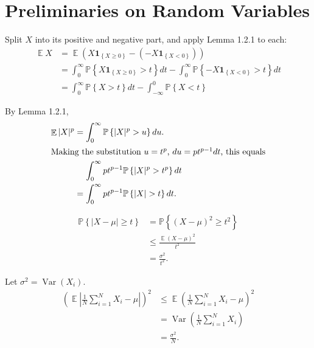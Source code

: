 \documentclass{report}
\theoremstyle{definition}
\newenvironment{exercise}[1]{
  \renewcommand\theexerciseimpl{#1}
  \exerciseimpl
}{\endexerciseimpl}
\DeclareMathOperator{\E}{\mathbb{E}}
\renewcommand{\P}[1]{\mathbb{P}\left\{#1\right\}}
\newcommand{\ind}[1]{\mathbf{1}_{\left\{#1\right\}}}
\DeclareMathOperator{\Var}{\mathrm{Var}}
\begin{document}
\begin{exercise}{0.0.6}
\end{exercise}


\chapter{Preliminaries on Random Variables}

\begin{exercise}{1.2.2}
  Split $X$ into its positive and negative part, and apply Lemma 1.2.1 to each:
  \begin{align*}
    \E X & = \E (X \ind{X \ge 0} - (-X \ind{X < 0})) \\
    & = \int_0^\infty \P{X \ind{X \ge 0} > t} dt - \int_{0}^{\infty} \P{-X \ind{X < 0} > t} dt \\
    & = \int_0^\infty \P{X > t} dt - \int_{-\infty}^0 \P{X < t}
  \end{align*}
\end{exercise}

\begin{exercise}{1.2.3}
  By Lemma 1.2.1,
  \begin{align*}
    \E |X|^p & = \int_0^\infty \P{|X|^p > u} du. \\
    \intertext{Making the substitution $u = t^p$, $du = p t^{p-1} dt$, this equals}
    & \mathrel{\phantom{=}} \int_0^\infty p t^{p-1} \P{|X|^p > t^p} dt \\
    & = \int_0^\infty p t^{p-1} \P{|X| > t} dt.
  \end{align*}
\end{exercise}

\begin{exercise}{1.2.6}
  \begin{align*}
    \P{|X - \mu| \ge t} & = \P{(X - \mu)^2 \ge t^2} \\
    & \le \frac{\E (X - \mu)^2}{t^2} \\
    & = \frac{\sigma^2}{t^2}.
  \end{align*}
\end{exercise}

\begin{exercise}{1.3.3}
  Let $\sigma^2 = \Var(X_i)$.
  \begin{align*}
    \left(\E \left|\frac{1}{N} \sum_{i=1}^N X_i - \mu\right|\right)^2 & \le \E \left(\frac{1}{N} \sum_{i=1}^N X_i - \mu\right)^2 \tag{by Jensen's inequality} \\
    & = \Var \left(\frac{1}{N} \sum_{i=1}^N X_i\right) \\
    & = \frac{\sigma^2}{N}. \tag{by equation 1.5}
  \end{align*}
\end{exercise}
\end{document}
